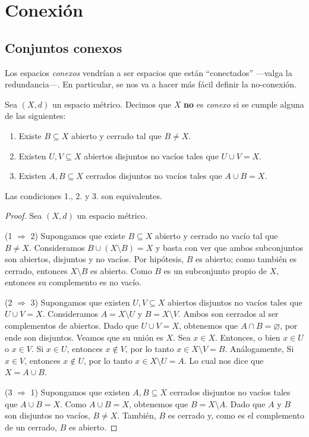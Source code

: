 \chapter{Conexión}

\section{Conjuntos conexos}

Los espacios \textit{conexos} vendrían a ser espacios que están ``conectados'' ---valga la redundancia---. En particular, se nos va a hacer más fácil definir la no-conexión.

\begin{definition}
	Sea $(X, d)$ un espacio métrico. Decimos que $X$ \textbf{no} es \emph{conexo} si se cumple alguna de las siguientes:
	\begin{enumerate}
		\item Existe $B \subseteq X$ abierto y cerrado tal que $B \neq X$.
		\item Existen $U, V \subseteq X$ abiertos disjuntos no vacíos tales que $U \cup V = X$.
		\item Existen $A, B \subseteq X$ cerrados disjuntos no vacíos tales que $A \cup B = X$.
	\end{enumerate}
\end{definition}

\begin{remark}
	Las condiciones 1., 2. y 3. son equivalentes.
\end{remark}

\begin{proof}
	Sea $(X, d)$ un espacio métrico.

	(1 $\Rightarrow$ 2) Supongamos que existe $B \subseteq X$ abierto y cerrado no vacío tal que $B \neq X$. Consideramos $B \cup (X \setminus B) = X$ y basta con ver que ambos subconjuntos son abiertos, disjuntos y no vacíos. Por hipótesis, $B$ es abierto; como también es cerrado, entonces $X \setminus B$ es abierto. Como $B$ es un subconjunto propio de $X$, entonces su complemento es no vacío.

	(2 $\Rightarrow$ 3) Supongamos que existen $U, V \subseteq X$ abiertos disjuntos no vacíos tales que $U \cup V = X$. Consideramos $A = X \setminus U$ y $B = X \setminus V$. Ambos son cerrados al ser complementos de abiertos. Dado que $U \cup V = X$, obtenemos que $A \cap B = \varnothing$, por ende son disjuntos. Veamos que su unión es $X$. Sea $x \in X$. Entonces, o bien $x \in U$ o $x \in V$. Si $x \in U$, entonces $x \not \in V$, por lo tanto $x \in X \setminus V = B$. Análogamente, Si $x \in V$, entonces $x \not \in U$, por lo tanto $x \in X \setminus U = A$. Lo cual nos dice que $X = A \cup B$.

	(3 $\Rightarrow$ 1) Supongamos que existen $A, B \subseteq X$ cerrados disjuntos no vacíos tales que $A \cup B = X$. Como $A \cup B = X$, obtenemos que $B = X \setminus A$. Dado que $A$ y $B$ son disjuntos no vacíos, $B \neq X$. También, $B$ es cerrado y, como es el complemento de un cerrado, $B$ es abierto.
\end{proof}

